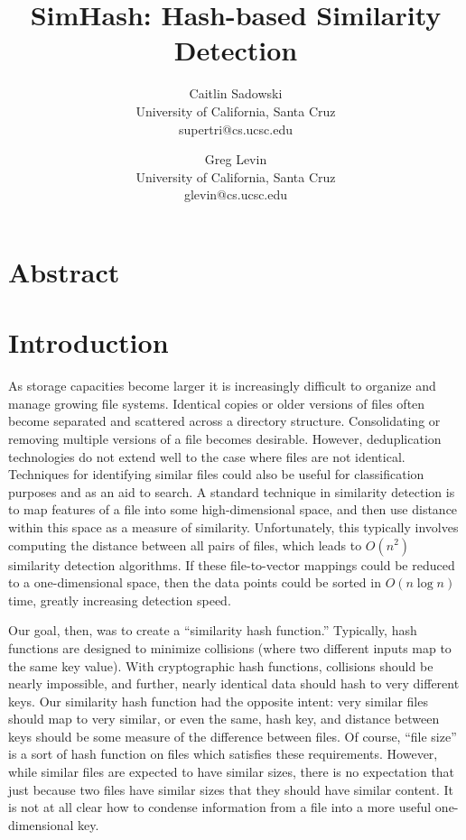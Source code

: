 \documentclass[10pt, twocolumn]{article}
\begin{document}
\title{SimHash: Hash-based Similarity Detection}

\author{Caitlin Sadowski\\
University of California, Santa Cruz\\
supertri@cs.ucsc.edu
\and
Greg Levin\\
University of California, Santa Cruz\\
glevin@cs.ucsc.edu}


\def\copyrightspace{}

\maketitle

\section{Abstract}


\section{Introduction}

As storage capacities become larger it is increasingly difficult to organize and manage growing file systems. Identical copies or older versions of files often become separated and scattered across a directory structure. Consolidating or removing multiple versions of a file becomes desirable. However, deduplication technologies do not extend well to the case where files are not identical. Techniques for identifying similar files could also be useful for classification purposes and as an aid to search.  A standard technique in similarity detection is to map features of a file into some high-dimensional space, and then use distance within this space as a measure of similarity.  Unfortunately, this typically involves computing the distance between all pairs of files, which leads to $O(n^2)$ similarity detection algorithms.  If these file-to-vector mappings could be reduced to a one-dimensional space, then the data points could be sorted in $O(n \log n)$ time, greatly increasing detection speed.

Our goal, then, was to create a ``similarity hash function.''  Typically, hash functions are designed to minimize collisions (where two different inputs map to the same key value).  With cryptographic hash functions, collisions should be nearly impossible, and further, nearly identical data should hash to very different keys.  Our similarity hash function had the opposite intent: very similar files should map to very similar, or even the same, hash key, and distance between keys should be some measure of the difference between files.  Of course, ``file size'' is a sort of hash function on files which satisfies these requirements.  However, while similar files are expected to have similar sizes, there is no expectation that just because two files have similar sizes that they should have similar content.  It is not at all clear how to condense information from a file into a more useful one-dimensional key.
\end{document}
